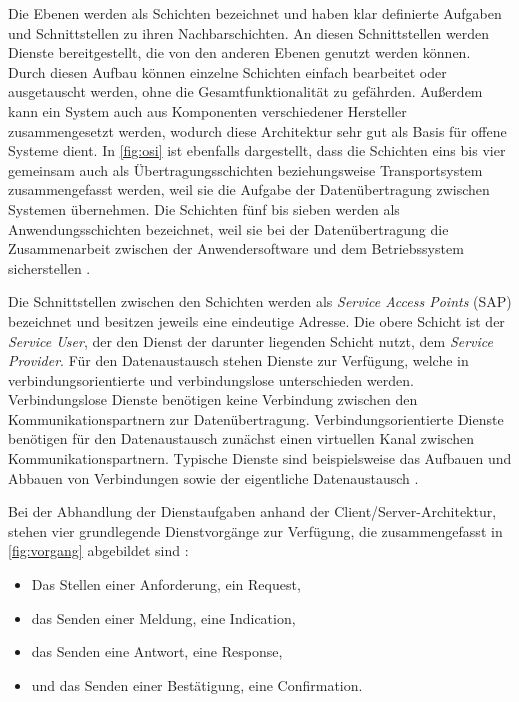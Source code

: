 Die Ebenen werden als Schichten bezeichnet und haben klar definierte Aufgaben und Schnittstellen zu ihren Nachbarschichten. An diesen Schnittstellen werden Dienste bereitgestellt, die von den anderen Ebenen genutzt werden können. Durch diesen Aufbau können einzelne Schichten einfach bearbeitet oder ausgetauscht werden, ohne die Gesamtfunktionalität zu gefährden. Außerdem kann ein System auch aus Komponenten verschiedener Hersteller zusammengesetzt werden, wodurch diese Architektur sehr gut als Basis für offene Systeme dient. In \ref{fig:osi} ist ebenfalls dargestellt, dass die Schichten eins bis vier gemeinsam auch als Übertragungsschichten beziehungsweise Transportsystem zusammengefasst werden, weil sie die Aufgabe der Datenübertragung zwischen Systemen übernehmen. Die Schichten fünf bis sieben werden als Anwendungsschichten bezeichnet, weil sie bei der Datenübertragung die Zusammenarbeit zwischen der Anwendersoftware und dem Betriebssystem sicherstellen \cite[S.~8f.]{schn06}.

Die Schnittstellen zwischen den Schichten werden als\textit{ Service Access Points} (SAP) bezeichnet und besitzen jeweils eine eindeutige Adresse. Die obere Schicht ist der \textit{Service User}, der den Dienst der darunter liegenden Schicht nutzt, dem \textit{Service Provider}. Für den Datenaustausch stehen Dienste zur Verfügung, welche in verbindungsorientierte und verbindungslose unterschieden werden. Verbindungslose Dienste benötigen keine Verbindung zwischen den Kommunikationspartnern zur Datenübertragung. Verbindungsorientierte Dienste benötigen für den Datenaustausch zunächst einen virtuellen Kanal zwischen Kommunikationspartnern. Typische Dienste sind beispielsweise das Aufbauen und Abbauen von Verbindungen sowie der eigentliche Datenaustausch \cite[S.~11f.]{schn06}.

Bei der Abhandlung der Dienstaufgaben anhand der Client/Server-Architektur, stehen vier grundlegende Dienstvorgänge zur Verfügung, die zusammengefasst in \ref{fig:vorgang} abgebildet sind \cite[S.~2f.]{mod06tcp}:

\begin{itemize}
	\item Das Stellen einer Anforderung, ein Request,
	\item das Senden einer Meldung, eine Indication,
	\item das Senden eine Antwort, eine Response,
	\item und das Senden einer Bestätigung, eine Confirmation.
\end{itemize}

